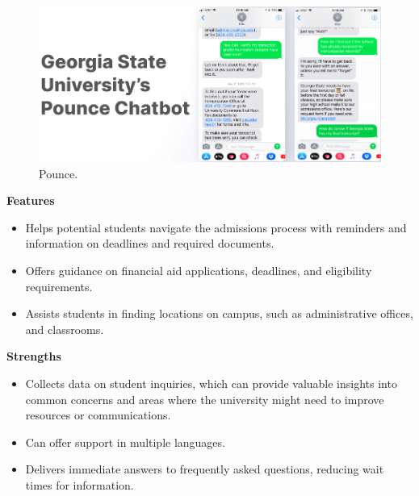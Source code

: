 \documentclass{l4proj}
\begin{document}
\begin{figure}[h!]
  \centering
  \begin{adjustbox}{center,max height=0.24\textheight, max width=\linewidth}
    \includegraphics{images/pounce.png}
  \end{adjustbox}
  \caption{Pounce.}
\end{figure}


\textbf{Features}
\begin{itemize}

    \item Helps potential students navigate the admissions process with reminders and information on deadlines and required documents.
    
    \item Offers guidance on financial aid applications, deadlines, and eligibility requirements.
    
    \item Assists students in finding locations on campus, such as administrative offices, and classrooms.
\end{itemize}

\textbf{Strengths}

\begin{itemize}

    \item Collects data on student inquiries, which can provide valuable insights into common concerns and areas where the university might need to improve resources or communications.

    \item  Can offer support in multiple languages.
    
    \item Delivers immediate answers to frequently asked questions, reducing wait times for information.
    
\end{itemize}
   
\end{document}
